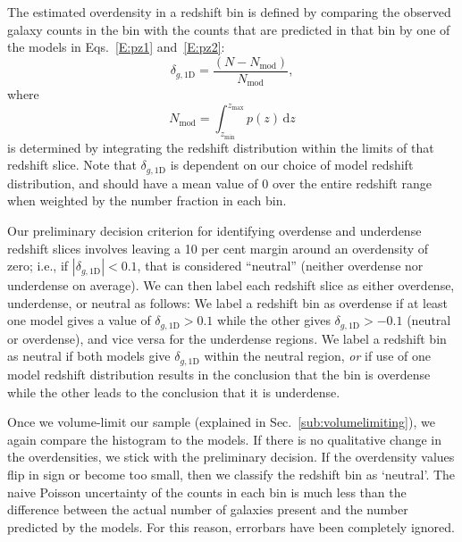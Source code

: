 \documentclass[twocolumn,useAMS,usenatbib]{mn2e}
\newcommand{\rachel}[1]{{\textcolor{red}{#1}}}
\newcommand{\arun}[1]{{\textcolor{blue}{#1}}}
\begin{document}
The estimated overdensity in a redshift bin is defined by comparing
the observed galaxy counts in the bin with the counts that are
predicted in that bin by one of the models in Eqs.~\eqref{E:pz1}
and~\eqref{E:pz2}:
\begin{equation}
\delta_{g,\text{1D}}=\frac{(N-N_{\text{mod}})}{N_{\text{mod}}},
\end{equation}
where
\begin{equation}
N_\text{mod} = \int_{z_\text{min}}^{z_\text{max}} p(z) \,\mathrm{d}z
\end{equation}
is determined by integrating the redshift distribution within the
limits of that redshift slice. 
Note that $\delta_{g,\text{1D}}$ is dependent on our choice of model
redshift distribution, and should have a mean value of $0$ over the
entire redshift range when weighted by the number fraction in each bin.

Our preliminary decision criterion for identifying overdense and underdense
redshift slices involves leaving a 10 per cent margin around an
overdensity of zero; i.e., if $\left| \delta_{g,\text{1D}} \right| <
0.1$, that is considered ``neutral'' (neither overdense nor
underdense on average).  We can then label each redshift slice as
either overdense, underdense, or neutral as follows: 
We label a redshift bin as overdense if at least one model gives a
value of $\delta_{g,\text{1D}} > 0.1$ while the other gives
$\delta_{g,\text{1D}} > -0.1$ 
(neutral or overdense), and vice versa for the underdense regions. We
label a redshift bin as neutral if both models give
$\delta_{g,\text{1D}}$ within the neutral region,  
\emph{or} if use of one model redshift distribution results in the
conclusion that the bin is overdense while the other leads to the
conclusion that it is underdense. 

Once we volume-limit our sample (explained in Sec.~\ref{sub:volumelimiting}), we again compare the histogram to the models.
If there is no qualitative change in the overdensities, we stick with the preliminary decision. If the overdensity values
flip in sign or become too small, then we classify the redshift bin as `neutral'.
The naive Poisson uncertainty of the counts
in each bin is much less than the difference between the actual number of galaxies present
and the number predicted by the models. For this reason, errorbars have been completely ignored.
\end{document}
